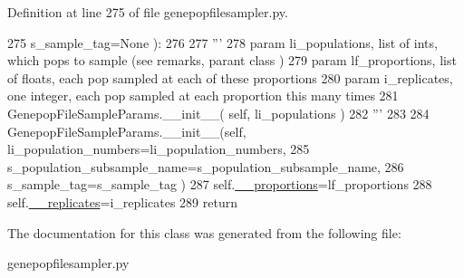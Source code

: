 Definition at line 275 of file genepopfilesampler.\+py.


\begin{DoxyCode}
275             s\_sample\_tag=\textcolor{keywordtype}{None} ):
276 
277         \textcolor{stringliteral}{'''}
278 \textcolor{stringliteral}{        param li\_populations, list of ints, which pops to sample (see remarks, parant class )}
279 \textcolor{stringliteral}{        param lf\_proportions, list of floats, each pop sampled at each of these proportions}
280 \textcolor{stringliteral}{        param i\_replicates, one integer, each pop sampled at each proportion this many times}
281 \textcolor{stringliteral}{        GenepopFileSampleParams.\_\_init\_\_( self, li\_populations )}
282 \textcolor{stringliteral}{        '''}
283 
284         GenepopFileSampleParams.\_\_init\_\_(self, li\_population\_numbers=li\_population\_numbers, 
285                                             s\_population\_subsample\_name=s\_population\_subsample\_name,
286                                             s\_sample\_tag=s\_sample\_tag )
287         self.\hyperlink{classnegui_1_1genepopfilesampler_1_1GenepopFileSampleParamsProportion_aa8dd8cef783da4e9bdb7c550e56382fd}{\_\_proportions}=lf\_proportions
288         self.\hyperlink{classnegui_1_1genepopfilesampler_1_1GenepopFileSampleParamsProportion_abebe5fb2092cd292a8d15269cb30bc33}{\_\_replicates}=i\_replicates
289         \textcolor{keywordflow}{return}
\end{DoxyCode}


The documentation for this class was generated from the following file\+:\begin{DoxyCompactItemize}
\item 
genepopfilesampler.\+py\end{DoxyCompactItemize}
